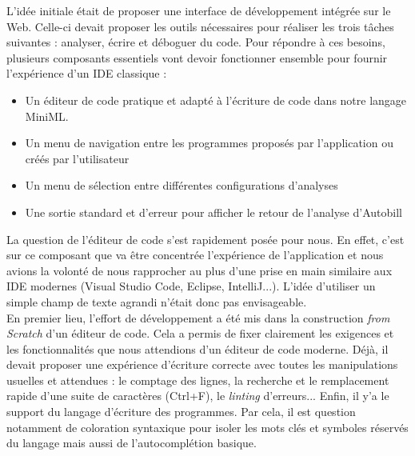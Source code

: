 \documentclass[12pt]{article}
\begin{document}
L'idée initiale était de proposer une interface de développement intégrée sur le Web. Celle-ci devait proposer les outils nécessaires pour réaliser les trois tâches suivantes : analyser, écrire et déboguer du code. Pour répondre à ces besoins, plusieurs composants essentiels vont devoir fonctionner ensemble pour fournir l'expérience d'un IDE classique :
\begin{itemize}
    \item Un éditeur de code pratique et adapté à l'écriture de code dans notre langage MiniML.
    \item Un menu de navigation entre les programmes proposés par l'application ou créés par l'utilisateur
    \item Un menu de sélection entre différentes configurations d'analyses
    \item Une sortie standard et d'erreur pour afficher le retour de l'analyse d'Autobill \\ 
\end{itemize} 

La question de l'éditeur de code s'est rapidement posée pour nous. En effet, c'est sur ce composant que va être concentrée l'expérience de l'application et nous avions la volonté de nous rapprocher au plus d'une prise en main similaire aux IDE modernes (Visual Studio Code, Eclipse, IntelliJ...). L'idée d'utiliser un simple champ de texte agrandi n'était donc pas envisageable. \\ 

En premier lieu, l'effort de développement a été mis dans la construction \textit{from Scratch} d'un éditeur de code. Cela a permis de fixer clairement les exigences et les fonctionnalités que nous attendions d'un éditeur de code moderne. Déjà, il devait proposer une expérience d'écriture correcte avec toutes les manipulations usuelles et attendues : le comptage des lignes, la recherche et le remplacement rapide d'une suite de caractères (Ctrl+F), le \textit{linting} d'erreurs... Enfin, il y'a le support du langage d'écriture des programmes. Par cela, il est question notamment de coloration syntaxique pour isoler les mots clés et symboles réservés du langage mais aussi de l'autocomplétion basique.  \\ 
\end{document}
